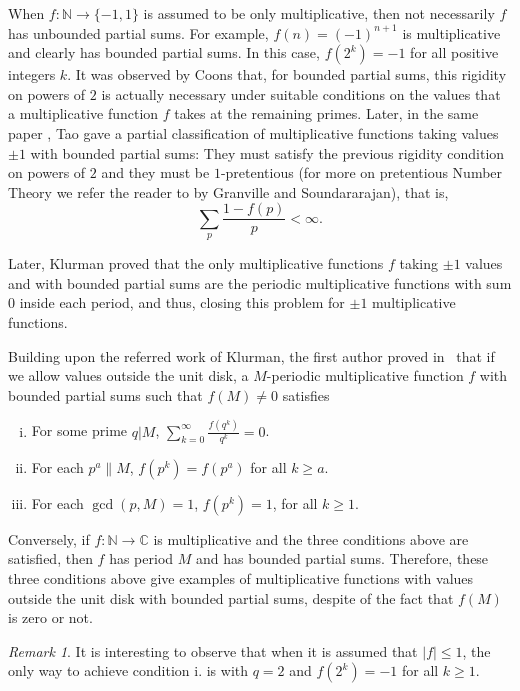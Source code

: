 \documentclass[a4paper,12pt, reqn0]{amsart}
\theoremstyle{remark}
\newtheorem{remark}{Remark}[section]
\newcommand{\CC}{\mathds{C}}
\newcommand{\NN}{\mathds{N}}
\begin{document}
When $f:\NN\to\{-1,1\}$ is assumed to be only multiplicative, then not
necessarily $f$ has unbounded partial sums. For example,
$f(n)=(-1)^{n+1}$ is multiplicative and clearly has bounded partial
sums. In this case, $f(2^k)=-1$ for all positive integers $k$. It was
observed by Coons \cite{coons_erdos} that, for bounded partial sums, this rigidity on powers of
$2$ is actually necessary under suitable conditions on the values that a multiplicative function
$f$ takes at the remaining primes. Later, in the same paper
\cite{tao_discrepancy}, Tao gave a partial classification of
multiplicative functions taking values $\pm 1$ with bounded partial
sums: They must satisfy the previous rigidity condition on powers of
$2$ and they must be $1$-pretentious (for more on pretentious Number
Theory we refer the reader to \cite{granvillepretentious} by Granville and
Soundararajan), that is,
$$\sum_{p}\frac{1-f(p)}{p}<\infty.$$

Later, Klurman \cite{Klurman*17} proved that the only multiplicative
functions $f$ taking $\pm 1$ values and with bounded partial sums are
the periodic multiplicative functions with sum $0$ inside each period,
and thus, closing this problem for $\pm1$ multiplicative functions.

Building upon the referred work of Klurman, the first author proved
in~\cite{Aymone*22} that if we allow values outside the unit disk, a
$M$-periodic multiplicative function $f$ with bounded partial sums
such that $f(M)\neq 0$ satisfies
\begin{enumerate}[i.]
\item For some prime $q|M$, $\sum_{k=0}^\infty \frac{f(q^k)}{q^k}=0$.
\item For each $p^a\| M$, $f(p^k)=f(p^a)$ for all $k\geq a$.
\item For each $\gcd(p,M)=1$, $f(p^k)=1$, for all $k\geq 1$.
\end{enumerate}
\noindent Conversely, if $f:\NN\to\CC$ is multiplicative and the three conditions above are satisfied, then $f$ has period $M$ and has bounded partial sums. Therefore, these three conditions above give examples of multiplicative functions with values outside the unit disk with bounded partial sums, despite of the fact that $f(M)$ is zero or not.

\begin{remark} It is interesting to observe that when it is assumed that $|f|\leq 1$, the only way to achieve condition i. is with $q=2$ and $f(2^k)=-1$ for all $k\geq 1$.
\end{remark}
\end{document}
